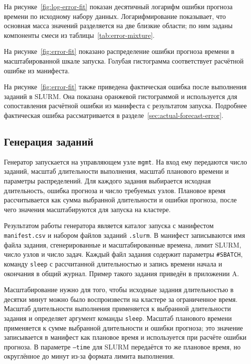 На рисунке~\ref{fig:log-error-fit} показан десятичный логарифм ошибки прогноза времени по исходному набору данных. Логарифмирование показывает, что основная масса значений разделяется на две близкие области; по ним заданы компоненты смеси из таблицы~\ref{tab:error-mixture}.


На рисунке~\ref{fig:error-fit} показано распределение ошибки прогноза времени в масштабированной шкале запуска. Голубая гистограмма соответствует расчётной ошибке из манифеста.


На рисунке~\ref{fig:error-fit} также приведена фактическая ошибка после выполнения заданий в SLURM. Она показана оранжевой гистограммой и используется для сопоставления расчётной ошибки из манифеста с результатом запуска. Подробнее фактическая ошибка рассматривается в разделе~\ref{sec:actual-forecast-error}.

\subsection{Генерация заданий}

Генератор запускается на управляющем узле \texttt{mgmt}. На вход ему передаются число заданий, масштаб длительности выполнения, масштаб планового времени и параметры распределений. Для каждого задания выбирается исходная длительность, ошибка прогноза и число требуемых узлов. Плановое время рассчитывается как сумма выбранной длительности и ошибки прогноза, после чего значения масштабируются для запуска на кластере.

Результатом работы генератора является каталог запуска с манифестом \texttt{manifest.csv} и набором файлов заданий \texttt{.slurm}. В манифест записываются имя файла задания, сгенерированные и масштабированные времена, лимит SLURM, число узлов и число задач. Каждый файл задания содержит параметры \texttt{#SBATCH}, команду \texttt{sleep} с рассчитанной длительностью и запись времени начала и окончания в общий журнал. Пример такого задания приведён в приложении A.

Масштабирование нужно для того, чтобы исходные задания длительностью в десятки минут можно было воспроизвести на кластере за ограниченное время. Масштаб длительности выполнения применяется к выбранной длительности задания и определяет аргумент команды \texttt{sleep}. Масштаб планового времени применяется к сумме выбранной длительности и ошибки прогноза; это значение записывается в манифест как плановое время и используется при расчёте ошибки прогноза. В параметре \texttt{--time} для SLURM передаётся то же плановое время, но округлённое до минут из-за формата лимита выполнения.

